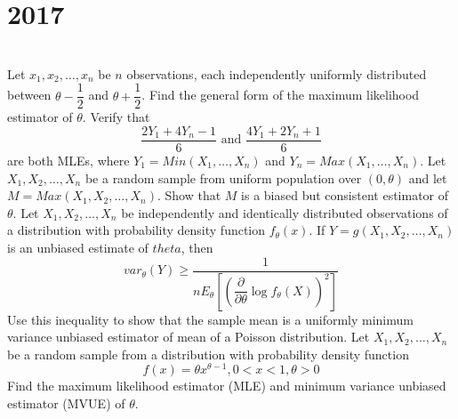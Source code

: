 \section*{2017}
\vspace{-.5cm}
\hrulefill \smallskip\\
 Let $x_1,x_2,\ldots,x_n$ be $n$ observations, each independently uniformly distributed between $\theta - \dfrac{1}{2}$ and $\theta + \dfrac{1}{2}$. Find the general form of the maximum likelihood estimator of $\theta$. Verify that \[\dfrac{2Y_1 + 4Y_n - 1}{6} \text{  and  } \dfrac{4Y_1 + 2Y_n + 1}{6} \] are both MLEs, where $Y_1 = Min(X_1,\ldots,X_n)$ and $Y_n = Max(X_1,\ldots,X_n)$.
\myline
{} Let $X_1,X_2,\ldots,X_n$ be a random sample from uniform population over $(0,\theta)$ and let $M = Max(X_1,X_2,\ldots,X_n)$. Show that $M$ is a biased but consistent estimator of $\theta$.
\myline
{} Let $X_1,X_2,\ldots,X_n$ be independently and identically distributed observations of a distribution with probability density function $f_{\theta}(x)$. If $Y=g(X_1,X_2,\ldots,X_n)$ is an unbiased estimate of $theta$, then
\[var_{\theta}(Y) \geq \dfrac{1}{nE_{\theta}\left[\left(\dfrac{\partial}{\partial \theta}\log f_{\theta}(X) \right)^2\right]} \] Use this inequality to show that the sample mean is a uniformly minimum variance unbiased estimator of mean of a Poisson distribution.
\myline
{} Let $X_1,X_2,\ldots,X_n$ be a random sample from a distribution with probability density function 
\[ f(x) = \theta x^{\theta -1}, 0 <x<1, \theta > 0\] Find the maximum likelihood estimator (MLE) and minimum variance unbiased estimator (MVUE) of $\theta$.